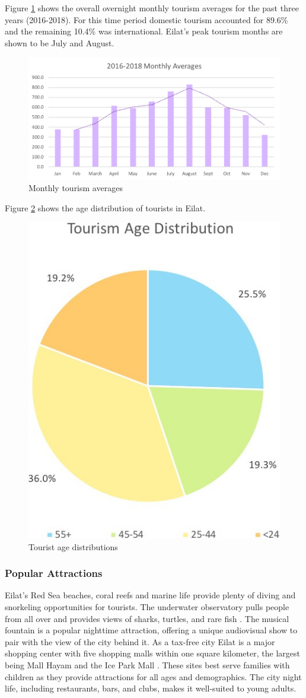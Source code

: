 \documentclass[12pt]{article}                               %
\begin{document}
Figure \ref{img:monthly_tourism} shows the overall overnight monthly tourism averages for the past three years (2016-2018). For this time period domestic tourism accounted for 89.6\% and the remaining 10.4\% was international. Eilat's peak tourism months are shown to be July and August.

\begin{figure}[H]
    \centering
    \includegraphics[width=1\columnwidth]{images/monthy_tourism_averages.png}
    \caption{Monthly tourism averages}
    \label{img:monthly_tourism}
\end{figure}
Figure \ref{img:tourist_ages} shows the age distribution of tourists in Eilat.

\begin{figure}[H]
    \centering
    \includegraphics[width=0.4\columnwidth]{images/tourist_ages.jpg}
    \caption{Tourist age distributions}
    \label{img:tourist_ages}
\end{figure}

\subsubsection{Popular Attractions}
Eilat's Red Sea beaches, coral reefs and marine life provide plenty of diving and snorkeling opportunities for tourists. The underwater observatory pulls people from all over and provides views of sharks, turtles, and rare fish \cite{Benner2017UpgradingEilat}. The musical fountain is a popular nighttime attraction, offering a unique audiovisual show to pair with the view of the city behind it. As a tax-free city Eilat is a major shopping center with five shopping malls within one square kilometer, the largest being Mall Hayam and the Ice Park Mall \cite{Benner2017UpgradingEilat}. These sites best serve families with children as they provide attractions for all ages and demographics. The city night life, including restaurants, bars, and clubs, makes it well-suited to young adults.
\end{document}
